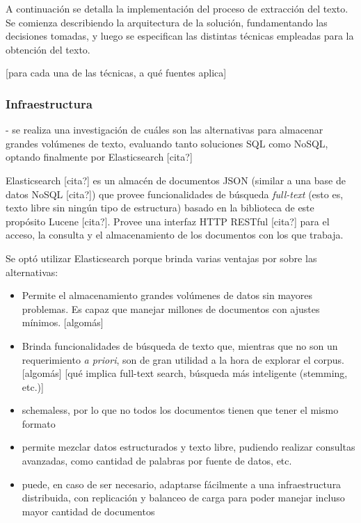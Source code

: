 A continuación se detalla la implementación del proceso de extracción del texto. Se comienza
describiendo la arquitectura de la solución, fundamentando las decisiones tomadas, y luego se
especifican las distintas técnicas empleadas para la obtención del texto.

[para cada una de las técnicas, a qué fuentes aplica]

\subsubsection{Infraestructura}

- se realiza una investigación de cuáles son las alternativas para almacenar grandes volúmenes de
  texto, evaluando tanto soluciones SQL como NoSQL, optando finalmente por Elasticsearch [cita?]

Elasticsearch [cita?] es un almacén de documentos JSON (similar a una base de datos NoSQL [cita?])
que provee funcionalidades de búsqueda \textit{full-text} (esto es, texto libre sin ningún tipo de
estructura) basado en la biblioteca de este propósito Lucene [cita?]. Provee una interfaz HTTP
RESTful [cita?] para el acceso, la consulta y el almacenamiento de los documentos con los que
trabaja.

Se optó utilizar Elasticsearch porque brinda varias ventajas por sobre las alternativas:

\begin{itemize}

\item Permite el almacenamiento grandes volúmenes de datos sin mayores problemas. Es capaz que
manejar millones de documentos con ajustes mínimos. [algomás]

\item Brinda funcionalidades de búsqueda de texto que, mientras que no son un requerimiento
\textit{a priori}, son de gran utilidad a la hora de explorar el corpus. [algomás] [qué implica
full-text search, búsqueda más inteligente (stemming, etc.)]

\item schemaless, por lo que no todos los documentos tienen que tener el mismo formato

\item permite mezclar datos estructurados y texto libre, pudiendo realizar consultas avanzadas, como
cantidad de palabras por fuente de datos, etc.

\item puede, en caso de ser necesario, adaptarse fácilmente a una infraestructura distribuida, con
replicación y balanceo de carga para poder manejar incluso mayor cantidad de documentos

\end{itemize}

